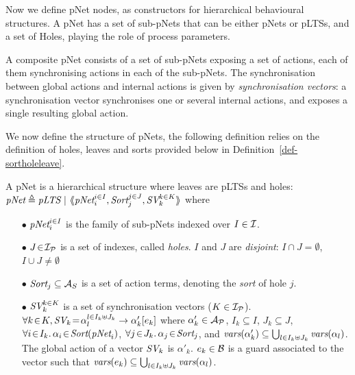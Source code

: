 \documentclass{lncs/llncs}
\begin{document}
Now we define
pNet nodes, as constructors for hierarchical behavioural structures.
A pNet has a set of sub-pNets that can be either pNets or pLTSs, and a
set of Holes, playing the role of process parameters.

A composite pNet consists of a set of sub-pNets exposing
a set of actions, each of them synchronising actions in each of
the sub-pNets. The synchronisation between global actions and
internal actions is given by  \emph{synchronisation vectors}: a
synchronisation vector synchronises one or several internal actions, and
exposes a single resulting global action.


We now define the structure of pNets, the following definition relies on the definition 
of holes, leaves and sorts provided below in Definition~\ref{def-sortholeleave}.

\begin{definition}[pNets]\label{def-pnets}
A pNet is a hierarchical structure where leaves are pLTSs and holes:\\
$\pNet\triangleq \pLTS~|~\mylangle \pNet_i^{i\in I}, \Sort_j^{j\in J}, \symb{SV}_k^{k\in 
K}\myrangle$
where
\begin{itemize}
\item[$\bullet$] $\pNet_i^{i\in I}$ is the family of sub-pNets indexed over $I \in \I$.

\item[$\bullet$] $J\!\in\!\I_\P$ is a set of indexes, called \emph{holes}.
$I$ and $J$ are \emph{disjoint}: $I\!\cap\! J=\emptyset$,  $I\!\cup\! J\neq\emptyset$
\item[$\bullet$] $\Sort_j \subseteq \AlgAS$ is a set of action terms, denoting the 
\emph{sort} of
hole $j$.

\item[$\bullet$] $\symb{SV}_k^{k\in K}$ is a set of
  synchronisation vectors ($K\in\I_\P$). $\forall k\!\in\! K,
  \symb{SV}_k\!=\!\SV{\alpha_{l}^{l\in I_k \uplus J_k}}{\alpha'_k}{e_k}$ where
  $\alpha'_k\in \mathcal{A}_\P$, $I_k\subseteq I$, $J_k\subseteq J$,
  $\forall i\!\in\!
  I_k.\,\alpha_{i}\!\in\!\Sort(\pNet_i)$,  $\forall j\!\in\!
  J_k.\,\alpha_{j}\!\in\!\Sort_j$, and $\vars(\alpha'_k)\subseteq \bigcup_{l\in I_k\uplus 
  J_k}{\vars({\alpha_l})}$. The global action of a vector $\symb{SV}_k$ is
$\alpha'_k$. $e_k \in \AlgB$ is a guard associated to the vector such that
$\vars(e_k)\subseteq \bigcup_{l\in I_k\uplus J_k}{\vars({\alpha_l})}$.


\end{itemize}
\end{definition}
\end{document}
